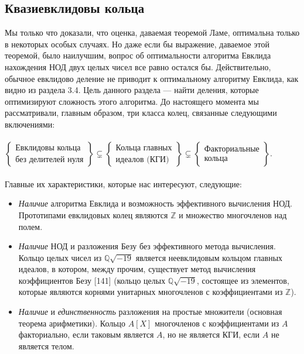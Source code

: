 \subsection{Квазиевклидовы кольца}
\noindent Мы только что доказали, что оценка, даваемая теоремой Ламе, оптимальна только в некоторых особых случаях. Но даже если бы выражение, даваемое этой теоремой, было наилучшим, вопрос об оптимальности алгоритма Евклида нахождения НОД двух целых чисел все равно
остался бы. Действительно, обычное евклидово деление не приводит
к оптимальному алгоритму Евклида, как видно из раздела 3.4. Цель
данного раздела — найти деления, которые оптимизируют сложность
этого алгоритма. До настоящего момента мы рассматривали, главным
образом, три класса колец, связанные следующими включениями:
\\\\
$ \left\lbrace
\begin{array}{c}
\text{Евклидовы кольца} \\
\text{без делителей нуля}
\end{array}
\right\rbrace \subsetneq
\left\lbrace
\begin{array}{l}
\text{Кольца главных} \\
\text{идеалов (КГИ)}
\end{array}
\right\rbrace \subsetneq
\left\lbrace
\begin{array}{l}
\text{Факториальные} \\
\text{кольца}
\end{array}
\right\rbrace .$
\\\\
Главные их характеристики, которые нас интересуют, следующие:
\begin{itemize}


\item\textit{Наличие} алгоритма Евклида и возможность эффективного вычи­сления НОД. Прототипами евклидовых колец являются $\mathbb{Z}$ и мно­жество многочленов над полем.
\item\textit{Наличие} НОД и разложения Безу без эффективного метода вычисления. Кольцо целых чисел из $\mathbb{Q}\sqrt{-19}$ является неевклидо­вым кольцом главных идеалов, в котором, между прочим, суще­ствует метод вычисления коэффициентов Безу [141] (кольцо це­лых $\mathbb{Q}\sqrt{-19}$, состоящее из элементов, которые являются корнями
унитарных многочленов с коэффициентами из $\mathbb{Z}$).
\item\textit{Наличие} и \textit{единственность} разложения на простые множители
(основная теорема арифметики). Кольцо $A[X]$ многочленов с коэффициентами из $A$ факториально, если таковым является $A$, но
не является КГИ, если $A$ не является телом.
\end{itemize}

